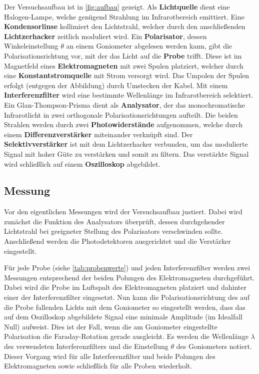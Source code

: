 Der Versuchsaufbau ist in \autoref{fig:aufbau} gezeigt.
Als \textbf{Lichtquelle} dient eine Halogen-Lampe,
    welche genügend Strahlung im Infrarotbereich emittiert.
Eine \textbf{Kondensorlinse} kollimiert den Lichtstrahl,
    welcher durch den anschließenden \textbf{Lichtzerhacker} zeitlich moduliert wird.
Ein \textbf{Polarisator},
    dessen Winkeleinstellung $\theta$ an einem Goniometer abgelesen werden kann,
gibt die Polarisationsrichtung vor,
    mit der das Licht auf die \textbf{Probe} trifft.
Diese ist im Magnetfeld eines \textbf{Elektromagneten} mit zwei Spulen platziert,
    welcher durch eine \textbf{Konstantstromquelle} mit Strom versorgt wird.
Das Umpolen der Spulen erfolgt (entgegen der Abbildung) durch Umstecken der Kabel.
Mit einem \textbf{Interferenzfilter} wird eine bestimmte Wellenlänge im Infrarotbereich selektiert.
Ein Glan-Thompson-Prisma dient als \textbf{Analysator},
    der das monochromatische Infrarotlicht in zwei orthogonale Polarisationsrichtungen aufteilt.
Die beiden Strahlen werden durch zwei \textbf{Photowiderstände} aufgenommen, %
    welche durch einem \textbf{Differenzverstärker} miteinander verknüpft sind.
Der \textbf{Selektivverstärker} ist mit dem Lichtzerhacker verbunden,
    um das modulierte Signal mit hoher Güte zu verstärken und somit zu filtern.
Das verstärkte Signal wird schließlich auf einem \textbf{Oszilloskop} abgebildet.



\subsection{Messung}
\label{sec:durchfuehrung:messung}
Vor den eigentlichen Messungen wird der Versuchsaufbau justiert.
Dabei wird zunächst die Funktion des Analysators überprüft,
    dessen durchgehender Lichtstrahl bei geeigneter Stellung des Polarisators verschwinden sollte.
Anschließend werden die Photodetektoren ausgerichtet und die Verstärker eingestellt.

Für jede Probe (siehe \autoref{tab:probenwerte}) und jeden Interferenzfilter werden zwei Messungen entsprechend der beiden Polungen des Elektromagneten durchgeführt.
Dabei wird die Probe im Luftspalt des Elektromagneten platziert und dahinter einer der Interferenzfilter eingesetzt.
Nun kann die Polarisationsrichtung des auf die Probe fallenden Lichts mit dem Goniometer so eingestellt werden,
dass das auf dem Oszilloskop abgebildete Signal eine minimale Amplitude (im Idealfall Null) aufweist.
Dies ist der Fall, wenn die am Goniometer eingestellte Polarisation die Faraday-Rotation gerade ausgleicht.
Es werden die Wellenlänge $\lambda$ des verwendeten Interferenzfilters und die Einstellung $\theta$ des Goniometers notiert.
Dieser Vorgang wird für alle Interferenzfilter und beide Polungen des Elektromagneten sowie schließlich für alle Proben wiederholt.

